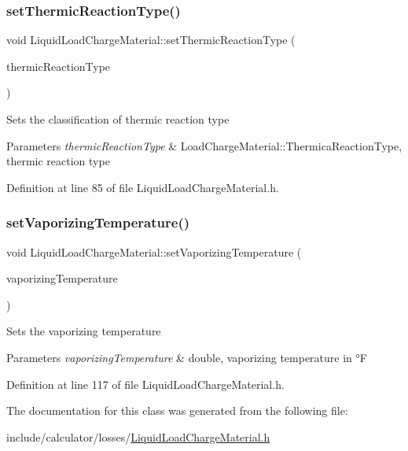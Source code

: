 \subsubsection{\texorpdfstring{set\+Thermic\+Reaction\+Type()}{setThermicReactionType()}}
{\footnotesize\ttfamily void Liquid\+Load\+Charge\+Material\+::set\+Thermic\+Reaction\+Type (\begin{DoxyParamCaption}\item[{\hyperlink{namespace_load_charge_material_a51d4263e865a5d86236622dd3fe23fd1}{Load\+Charge\+Material\+::\+Thermic\+Reaction\+Type}}]{thermic\+Reaction\+Type }\end{DoxyParamCaption})\hspace{0.3cm}{\ttfamily [inline]}}

Sets the classification of thermic reaction type 
\begin{DoxyParams}{Parameters}
{\em thermic\+Reaction\+Type} & Load\+Charge\+Material\+::\+Thermica\+Reaction\+Type, thermic reaction type \\
\hline
\end{DoxyParams}


Definition at line 85 of file Liquid\+Load\+Charge\+Material.\+h.

\mbox{\label{class_liquid_load_charge_material_a50938e3270de5d3c59b872f290a761cc}} 
\subsubsection{\texorpdfstring{set\+Vaporizing\+Temperature()}{setVaporizingTemperature()}}
{\footnotesize\ttfamily void Liquid\+Load\+Charge\+Material\+::set\+Vaporizing\+Temperature (\begin{DoxyParamCaption}\item[{const double}]{vaporizing\+Temperature }\end{DoxyParamCaption})\hspace{0.3cm}{\ttfamily [inline]}}

Sets the vaporizing temperature 
\begin{DoxyParams}{Parameters}
{\em vaporizing\+Temperature} & double, vaporizing temperature in °F \\
\hline
\end{DoxyParams}


Definition at line 117 of file Liquid\+Load\+Charge\+Material.\+h.



The documentation for this class was generated from the following file\+:\begin{DoxyCompactItemize}
\item 
include/calculator/losses/\hyperlink{_liquid_load_charge_material_8h}{Liquid\+Load\+Charge\+Material.\+h}\end{DoxyCompactItemize}
